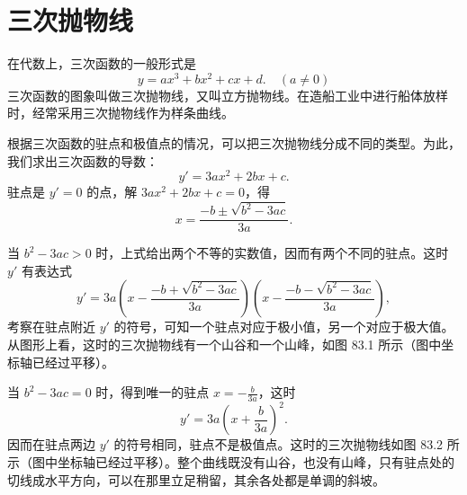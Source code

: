 \section{三次抛物线}

在代数上，三次函数的一般形式是
\[
  y = ax^3 + bx^2 + cx + d. \quad (a \neq 0)
\]
三次函数的图象叫做三次抛物线，又叫立方抛物线。在造船工业中进行船体放样时，经常采用三次抛物线作为样条曲线。

根据三次函数的驻点和极值点的情况，可以把三次抛物线分成不同的类型。为此，我们求出三次函数的导数：
\[
  y' = 3ax^2 + 2bx + c.
\]
驻点是 $y' = 0$ 的点，解 $3ax^2 + 2bx + c = 0$，得
\[
  x = \frac{-b \pm \sqrt{b^2 - 3ac}}{3a}.
\]

当 $b^2 - 3ac > 0$ 时，上式给出两个不等的实数值，因而有两个不同的驻点。这时 $y'$ 有表达式
\[
  y' = 3a\left(x - \frac{-b + \sqrt{b^2 - 3ac}}{3a}\right)\left(x - \frac{-b - \sqrt{b^2 - 3ac}}{3a}\right),
\]
考察在驻点附近 $y'$ 的符号，可知一个驻点对应于极小值，另一个对应于极大值。从图形上看，这时的三次抛物线有一个山谷和一个山峰，如图 83.1 所示（图中坐标轴已经过平移）。

当 $b^2 - 3ac = 0$ 时，得到唯一的驻点 $x = -\frac{b}{3a}$，这时
\[
  y' = 3a\left(x + \frac{b}{3a}\right)^2.
\]
因而在驻点两边 $y'$ 的符号相同，驻点不是极值点。这时的三次抛物线如图 83.2 所示（图中坐标轴已经过平移）。整个曲线既没有山谷，也没有山峰，只有驻点处的切线成水平方向，可以在那里立足稍留，其余各处都是单调的斜坡。

